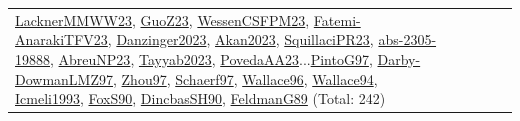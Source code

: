 {\begin{longtable}{p{3cm}r>{\raggedright\arraybackslash}p{6cm}>{\raggedright\arraybackslash}p{6cm}>{\raggedright\arraybackslash}p{8cm}}
\hyperref[detail:LacknerMMWW23]{LacknerMMWW23}, \hyperref[detail:GuoZ23]{GuoZ23}, \hyperref[detail:WessenCSFPM23]{WessenCSFPM23}, \hyperref[detail:Fatemi-AnarakiTFV23]{Fatemi-AnarakiTFV23}, \hyperref[detail:Danzinger2023]{Danzinger2023}, \hyperref[detail:Akan2023]{Akan2023}, \hyperref[detail:SquillaciPR23]{SquillaciPR23}, \hyperref[detail:abs-2305-19888]{abs-2305-19888}, \hyperref[detail:AbreuNP23]{AbreuNP23}, \hyperref[detail:Tayyab2023]{Tayyab2023}, \hyperref[detail:PovedaAA23]{PovedaAA23}...\hyperref[detail:PintoG97]{PintoG97}, \hyperref[detail:Darby-DowmanLMZ97]{Darby-DowmanLMZ97}, \hyperref[detail:Zhou97]{Zhou97}, \hyperref[detail:Schaerf97]{Schaerf97}, \hyperref[detail:Wallace96]{Wallace96}, \hyperref[detail:Wallace94]{Wallace94}, \hyperref[detail:Icmeli1993]{Icmeli1993}, \hyperref[detail:FoxS90]{FoxS90}, \hyperref[detail:DincbasSH90]{DincbasSH90}, \hyperref[detail:FeldmanG89]{FeldmanG89} (Total: 242)\\

\end{longtable}}
